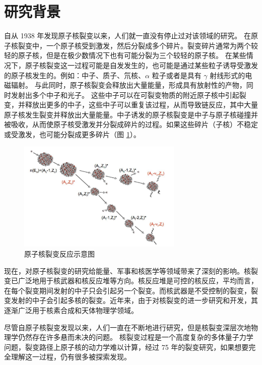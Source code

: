 \documentclass[AutoFakeBold]{LZUThesis}
\begin{document}
\section{研究背景}
自从 1938 年发现原子核裂变以来\cite{meitner1939disintegration}，人们就一直没有停止过对该领域的研究。
在原子核裂变中，一个原子核受到激发，然后分裂成多个碎片。裂变碎片通常为两个较轻的原子核，但是在极少数情况下也有可能分裂为三个较轻的原子核\cite{vijayaraghavan2014collinear}。
在某些情况下，原子核裂变这一过程可能是自发发生的，也可能是通过某些粒子诱导受激发的原子核发生的。例如：中子、质子、氘核、$\alpha$ 粒子或者是具有 $\gamma$ 射线形式的电磁辐射。
与此同时，原子核裂变会释放出大量能量，形成具有放射性的产物，同时发射出多个中子和光子。
这些中子可以在可裂变物质的附近原子核中引起裂变，并释放出更多的中子，这些中子可以重复该过程，从而导致链反应，其中大量原子核发生裂变并释放出大量能量\cite{anderson1939neutron, bohr1939mechanism}。中子诱发的原子核裂变是中子与原子核碰撞并被吸收，从而使原子核受激发并分裂成碎片的过程。如果这些碎片（子核）不稳定或受激发，也可能分裂成更多碎片（图 \ref{fig_nuclear_fission}）。 

\begin{figure}[H]
    \centering
    \includegraphics[width=0.7\textwidth]{figures/nuclear_fission.png}
    \caption{原子核裂变反应示意图\cite{kovacs1970angular}}
    \label{fig_nuclear_fission}
\end{figure}

现在，对原子核裂变的研究给能量、军事和核医学等领域带来了深刻的影响。核裂变已广泛地用于核武器和核反应堆等方向。核反应堆是可控的核反应，平均而言，在每个裂变期间发射的中子只会引起另一个裂变。而核武器是不受控制的裂变，裂变发射的中子会引起多核的裂变。近年来，由于对核裂变的进一步研究和开发，其逐渐广泛用于核素合成和天体物理学领域。

尽管自原子核裂变发现以来，人们一直在不断地进行研究，但是核裂变深层次地物理学仍然存在许多悬而未决的问题。
核裂变过程是一个高度复杂的多体量子力学问题，裂变路径上原子核的动力学难以计算，经过 75 年的裂变研究，如果想要完全理解这一过程，仍有很多被探索发现。
\end{document}
